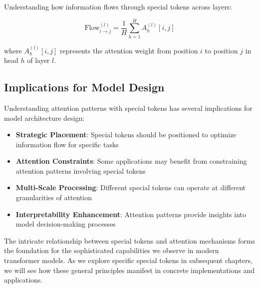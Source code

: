Understanding how information flows through special tokens across layers:

\begin{equation}
\text{Flow}_{i \rightarrow j}^{(l)} = \frac{1}{H} \sum_{h=1}^{H} A_h^{(l)}[i,j]
\end{equation}

where $A_h^{(l)}[i,j]$ represents the attention weight from position $i$ to position $j$ in head $h$ of layer $l$.

\subsection{Implications for Model Design}

Understanding attention patterns with special tokens has several implications for model architecture design:

\begin{itemize}
\item \textbf{Strategic Placement}: Special tokens should be positioned to optimize information flow for specific tasks
\item \textbf{Attention Constraints}: Some applications may benefit from constraining attention patterns involving special tokens
\item \textbf{Multi-Scale Processing}: Different special tokens can operate at different granularities of attention
\item \textbf{Interpretability Enhancement}: Attention patterns provide insights into model decision-making processes
\end{itemize}

The intricate relationship between special tokens and attention mechanisms forms the foundation for the sophisticated capabilities we observe in modern transformer models. As we explore specific special tokens in subsequent chapters, we will see how these general principles manifest in concrete implementations and applications.